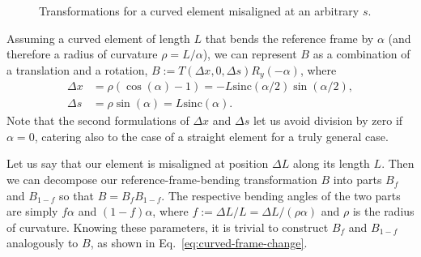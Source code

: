 \begin{figure}[H]
	\caption{Transformations for a curved element misaligned at an arbitrary $s$.}
\end{figure}

Assuming a curved element of length $L$ that bends the reference frame by $\alpha$ (and therefore a radius of curvature $\rho = L / \alpha$), we can represent $B$ as a combination of a translation and a rotation, $B := T(\Delta x, 0, \Delta s) R_y(-\alpha)$, where
\begin{equation}\label{eq:curved-frame-change}
	\begin{aligned}
		\Delta x &= \rho (\cos(\alpha) - 1) = - L \mathrm{sinc}(\alpha / 2) \sin(\alpha / 2), \\
		\Delta s &= \rho \sin(\alpha) = L \mathrm{sinc}(\alpha).
	\end{aligned}
\end{equation}
Note that the second formulations of $\Delta x$ and $\Delta s$ let us avoid division by zero if $\alpha = 0$, catering also to the case of a straight element for a truly general case.

Let us say that our element is misaligned at position $\Delta L$ along its length $L$.
Then we can decompose our reference-frame-bending transformation $B$ into parts $B_f$ and $B_{1-f}$ so that $B = B_f B_{1-f}$.
The respective bending angles of the two parts are simply $f \alpha$ and $(1 - f) \alpha$, where $f := \Delta L/L = \Delta L / (\rho \alpha)$ and $\rho$ is the radius of curvature.
Knowing these parameters, it is trivial to construct $B_f$ and $B_{1 - f}$ analogously to $B$, as shown in Eq.~\ref{eq:curved-frame-change}.

